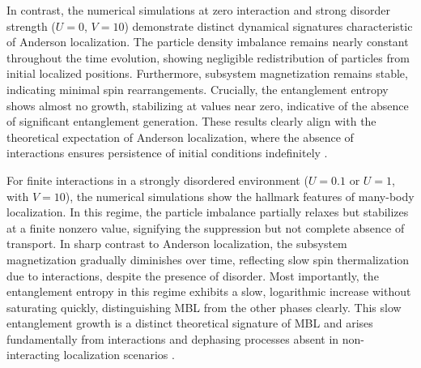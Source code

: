 In contrast, the numerical simulations at zero interaction and strong disorder strength ($U=0$, $V=10$) demonstrate distinct dynamical signatures characteristic of Anderson localization. The particle density imbalance remains nearly constant throughout the time evolution, showing negligible redistribution of particles from initial localized positions. Furthermore, subsystem magnetization remains stable, indicating minimal spin rearrangements. Crucially, the entanglement entropy shows almost no growth, stabilizing at values near zero, indicative of the absence of significant entanglement generation. These results clearly align with the theoretical expectation of Anderson localization, where the absence of interactions ensures persistence of initial conditions indefinitely \cite{anderson_absence_1958,abrahams_50_2010}.

For finite interactions in a strongly disordered environment ($U=0.1$ or $U=1$, with $V=10$), the numerical simulations show the hallmark features of many-body localization. In this regime, the particle imbalance partially relaxes but stabilizes at a finite nonzero value, signifying the suppression but not complete absence of transport. In sharp contrast to Anderson localization, the subsystem magnetization gradually diminishes over time, reflecting slow spin thermalization due to interactions, despite the presence of disorder. Most importantly, the entanglement entropy in this regime exhibits a slow, logarithmic increase without saturating quickly, distinguishing MBL from the other phases clearly. This slow entanglement growth is a distinct theoretical signature of MBL and arises fundamentally from interactions and dephasing processes absent in non-interacting localization scenarios \cite{basko_metalinsulator_2006,nandkishore_many-body_2015}.




